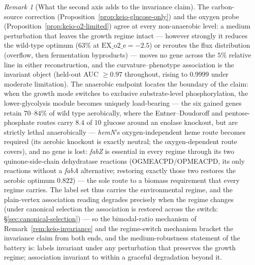 \documentclass[11pt,a4paper]{article}
\theoremstyle{plain}
\theoremstyle{definition}
\theoremstyle{remark}
\newtheorem{remark}[theorem]{Remark}
\begin{document}
\begin{remark}[What the second axis adds to the invariance claim]
\label{rem:keio-o2-invariance}
The carbon-source correction
(Proposition~\ref{prop:keio-glucose-only}) and the oxygen probe
(Proposition~\ref{prop:keio-o2-limited}) agree at every
non-anaerobic level: a medium perturbation that leaves the growth
regime intact --- however strongly it reduces the wild-type optimum
($63\%$ at $\mathrm{EX\_o2\_e}=-2.5$) or reroutes the flux
distribution (overflow, then fermentation byproducts) --- moves no
gene across the $5\%$ relative line in either reconstruction, and
the curvature--phenotype association is the invariant object
(held-out AUC $\ge 0.97$ throughout, rising to $0.9999$ under
moderate limitation). The anaerobic endpoint locates the boundary of
the claim: when the growth mode switches to exclusive
substrate-level phosphorylation, the lower-glycolysis module becomes
uniquely load-bearing --- the six gained genes retain $70$--$84\%$
of wild type aerobically, where the Entner--Doudoroff and
pentose-phosphate routes carry $8.4$ of $10$ glucose around an
enolase knockout, but are strictly lethal anaerobically ---
\emph{hemN}'s oxygen-independent heme route becomes required (its
aerobic knockout is exactly neutral; the oxygen-dependent route
covers), and no gene is lost: \emph{fabZ} is essential in every regime through its two
quinone-side-chain dehydratase reactions (OGMEACPD/OPMEACPD, its
only reactions without a \emph{fabA} alternative; restoring exactly
those two restores the aerobic optimum $0.822$) --- the sole route
to a biomass requirement that every regime carries. The label set
thus carries the environmental regime, and the plain-vertex
association reading degrades precisely when the regime changes
(under canonical selection the association is restored across the
switch: \S\ref{sec:canonical-selection}) --- so the bimodal-ratio
mechanism of
Remark~\ref{rem:keio-invariance} and the regime-switch mechanism
bracket the invariance claim from both ends, and the
medium-robustness statement of the battery is: labels invariant
under any perturbation that preserves the growth regime;
association invariant to within a graceful degradation beyond it.
\end{remark}
\end{document}
